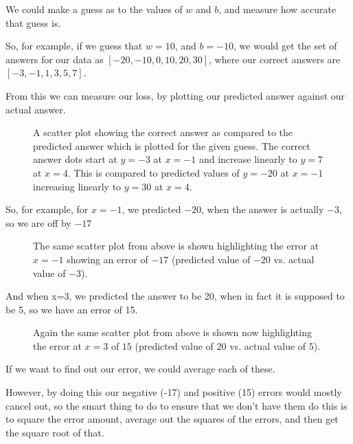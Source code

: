 We could make a guess as to the values of $w$ and $b$, and measure how accurate that guess is.

So, for example, if we guess that $w=10$, and $b = -10$, we would get the set of answers for our data as $[-20, -10, 0, 10, 20, 30]$, where our correct answers are $[-3, -1, 1, 3, 5, 7]$.

From this we can measure our loss, by plotting our predicted answer against our actual answer.

\begin{figure}
    \caption{A scatter plot showing the correct answer as compared to the predicted answer which is plotted for the given guess. The correct answer dots start at $y = -3$ at $x = -1$ and increase linearly to $y = 7$ at $x = 4$. This is compared to predicted values of $y = -20$ at $x = -1$ increasing linearly to $y = 30$ at $x = 4$.}
\end{figure}  



So, for example, for $x=-1$, we predicted $-20$, when the answer is actually $-3$, so we are off by $-17$


\begin{figure}
    \caption{The same scatter plot from above is shown highlighting the error at $x = -1$ showing an error of $-17$ (predicted value of $-20$ vs. actual value of $-3$).}
\end{figure}  



And when x=3, we predicted the answer to be 20, when in fact it is supposed to be 5, so we have an error of 15.

\begin{figure}
    \caption{Again the same scatter plot from above is shown now highlighting the error at $x = 3$ of $15$ (predicted value of $20$ vs. actual value of $5$).}
\end{figure}  

If we want to find out our error, we could average each of these.

However, by doing this our negative (-17) and positive (15) errors would mostly cancel out, so the smart thing to do to ensure that we don’t have them do this is to square the error amount, average out the squares of the errors, and then get the square root of that.


